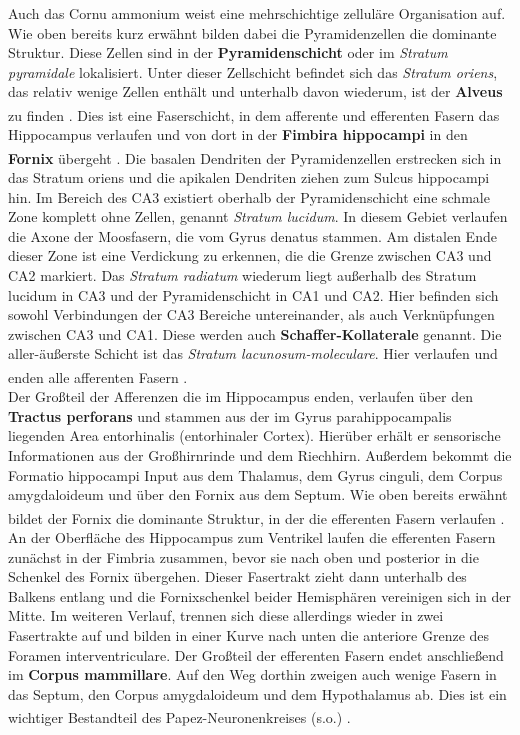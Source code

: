 \documentclass[12pt,a4paper,pdftex]{article}
\begin{document}
Auch das Cornu ammonium weist eine mehrschichtige zelluläre Organisation auf. Wie oben bereits kurz erwähnt bilden dabei die Pyramidenzellen die dominante Struktur. Diese Zellen sind in der \textbf{Pyramidenschicht} oder im \textit{Stratum pyramidale} lokalisiert. Unter dieser Zellschicht befindet sich das \textit{Stratum oriens}, das relativ wenige Zellen enthält und unterhalb davon wiederum, ist der \textbf{Alveus} zu finden \textsuperscript{\cite[20]{paxinos2014rat}}. Dies ist eine Faserschicht, in dem afferente und efferenten Fasern das Hippocampus verlaufen und von dort in der \textbf{Fimbira hippocampi} in den \textbf{Fornix}  übergeht \textsuperscript{\cite[9]{trepel2011neuroanatomie}}. Die basalen Dendriten der Pyramidenzellen erstrecken sich in das Stratum oriens und die apikalen Dendriten ziehen zum Sulcus hippocampi hin. Im Bereich des CA3 existiert oberhalb der Pyramidenschicht eine schmale Zone komplett ohne Zellen, genannt \textit{Stratum lucidum}. In diesem Gebiet verlaufen die Axone der Moosfasern, die vom Gyrus denatus stammen. Am distalen Ende dieser Zone ist eine Verdickung zu erkennen, die die Grenze zwischen CA3 und CA2 markiert. Das \textit{Stratum radiatum} wiederum liegt außerhalb des Stratum lucidum in CA3 und der Pyramidenschicht in CA1 und CA2. Hier befinden sich sowohl Verbindungen der CA3 Bereiche untereinander, als auch Verknüpfungen zwischen CA3 und CA1. Diese werden auch \textbf{Schaffer-Kollaterale}  genannt. Die aller-äußerste Schicht ist das \textit{Stratum lacunosum-moleculare}. Hier verlaufen und enden alle afferenten Fasern \textsuperscript{\cite[20]{paxinos2014rat}}.\\
Der Großteil der Afferenzen die im Hippocampus enden, verlaufen über den \textbf{Tractus perforans}  und stammen aus der im Gyrus parahippocampalis liegenden Area entorhinalis (entorhinaler Cortex). Hierüber erhält er sensorische Informationen aus der Großhirnrinde und dem Riechhirn. Außerdem bekommt die Formatio hippocampi Input aus dem Thalamus, dem Gyrus cinguli, dem Corpus amygdaloideum und über den Fornix aus dem Septum. Wie oben bereits erwähnt bildet der Fornix die dominante Struktur, in der die efferenten Fasern verlaufen \textsuperscript{\cite[9]{trepel2011neuroanatomie}}. An der Oberfläche des Hippocampus zum Ventrikel laufen die efferenten Fasern zunächst in der Fimbria zusammen, bevor sie nach oben und posterior in die Schenkel des Fornix übergehen. Dieser Fasertrakt zieht dann unterhalb des Balkens entlang und die Fornixschenkel beider Hemisphären vereinigen sich in der Mitte. Im weiteren Verlauf, trennen sich diese allerdings wieder in zwei Fasertrakte auf und bilden in einer Kurve nach unten die anteriore Grenze des Foramen interventriculare. Der Großteil der efferenten Fasern endet anschließend im \textbf{Corpus mammillare}. Auf den Weg dorthin zweigen auch wenige Fasern in das Septum, den Corpus amygdaloideum und dem Hypothalamus ab. Dies ist ein wichtiger Bestandteil des Papez-Neuronenkreises (s.o.) \textsuperscript{\cite[12]{crossman2014neuroanatomy}}.\\
\end{document}
